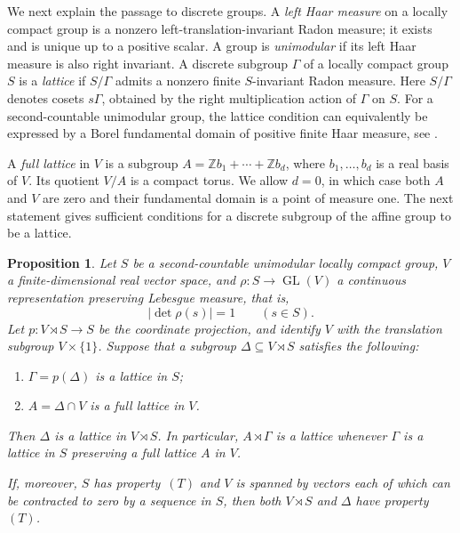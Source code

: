 \documentclass[11pt,a4paper]{article}
\newtheorem{proposition}[theorem]{Proposition}
\theoremstyle{definition}
\newcommand{\Z}{\mathbb Z}
\newcommand{\GL}{\operatorname{GL}}
\newcommand{\rt}{(T)}
\begin{document}
We next explain the passage to discrete groups. 
A \emph{left Haar measure} on a
locally compact group is a nonzero left-translation-invariant
Radon measure; it exists and is unique up to a positive scalar.
A group is \emph{unimodular} if its left Haar measure is also
right invariant. A discrete subgroup \(\Gamma\) of a locally
compact group \(S\) is a \emph{lattice} if \(S/\Gamma\)
admits a nonzero finite \(S\)-invariant Radon measure.
Here \(S/\Gamma\) denotes cosets \(s\Gamma\), obtained
by the right multiplication action of \(\Gamma\) on \(S\).
For a second-countable unimodular group, the lattice condition
can equivalently be expressed by a Borel fundamental domain
of positive finite Haar measure, see
\cite[Sections~A.3 and~B.1--B.2]{BHV}.

A \emph{full lattice} in \(V\) is a subgroup
\(A=\Z b_1+\cdots+\Z b_d\), where \(b_1,\ldots,b_d\)
is a real basis of \(V\). Its quotient \(V/A\) is a compact
torus. We allow \(d=0\), in which case both \(A\) and
\(V\) are zero and their fundamental domain is a point of
measure one.
The next statement gives sufficient conditions for a discrete subgroup of the affine group to be a lattice.
\begin{proposition}
\label{prop:affinelattice}
Let \(S\) be a second-countable unimodular locally compact
group, \(V\) a finite-dimensional real vector space, and
\(\rho:S\to\GL(V)\) a continuous representation preserving
Lebesgue measure, that is,
\[
 |\det\rho(s)|=1\qquad(s\in S).
\]
Let \(p:V\rtimes S\to S\) be the coordinate projection,
and identify \(V\) with the translation subgroup
\(V\times\{1\}\). Suppose that a subgroup
\(\Delta\subseteq V\rtimes S\) satisfies the following:
\begin{enumerate}[label=\textup{(\roman*)},beginpenalty=10000,midpenalty=10000]
 \item \(\Gamma=p(\Delta)\) is a lattice in \(S\);
 \item \(A=\Delta\cap V\) is a full lattice in \(V\).
\end{enumerate}
Then \(\Delta\) is a lattice in \(V\rtimes S\).
In particular, \(A\rtimes\Gamma\) is a
lattice whenever \(\Gamma\) is a lattice in \(S\) preserving
a full lattice \(A\) in \(V\).

If, moreover, \(S\) has property~\(\rt\) and \(V\) is
spanned by vectors each of which can be contracted to zero
by a sequence in \(S\), then both \(V\rtimes S\) and
\(\Delta\) have property~\(\rt\).
\end{proposition}
\end{document}
